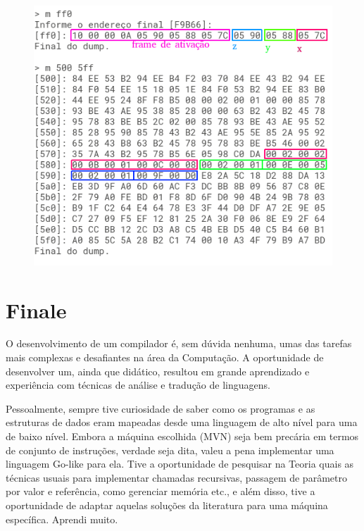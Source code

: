 \documentclass[a4paper,12pt]{report}
\begin{document}
    \begin{figure}[h]
        \centering
        \includegraphics[scale=0.65]{mult}
    \end{figure}

    \chapter*{Finale}
    O desenvolvimento de um compilador é, sem dúvida nenhuma, umas das tarefas mais complexas e desafiantes na área da Computação. A oportunidade de desenvolver um, ainda que didático, resultou em grande aprendizado e experiência com técnicas de análise e tradução de linguagens.

    Pessoalmente, sempre tive curiosidade de saber como os programas e as estruturas de dados eram mapeadas desde uma linguagem de alto nível para uma de baixo nível. Embora a máquina escolhida (MVN) seja bem precária em termos de conjunto de instruções, verdade seja dita, valeu a pena implementar uma linguagem Go-like para ela. Tive a oportunidade de pesquisar na Teoria quais as técnicas usuais para implementar chamadas recursivas, passagem de parâmetro por valor e referência, como gerenciar memória etc., e além disso, tive a oportunidade de adaptar aquelas soluções da literatura para uma máquina específica. Aprendi muito.
\end{document}
